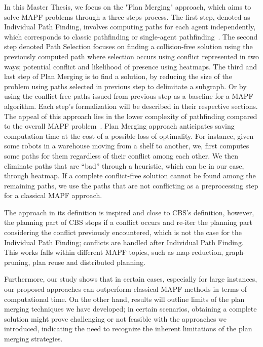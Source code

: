 In this Master Thesis, we focus on the "Plan Merging" approach, which aims to solve MAPF problems through a three-steps process. The first step, denoted as Individual Path Finding, involves computing paths for each agent independently, which corresponds to classic pathfinding or single-agent pathfinding~\cite{foghkuhagu21a}. The second step denoted Path Selection focuses on finding a collision-free solution using the previously computed path where selection occurs using conflict represented in two ways; potential conflict and likelihood of presence using heatmaps. The third and last step of Plan Merging is to find a solution, by reducing the size of the problem using paths selected in previous step to delimitate a subgraph. Or by using the conflict-free paths issued from previous step as a baseline for a MAPF algorithm. Each step's formalization will be described in their respective sections. The appeal of this approach lies in the lower complexity of pathfinding compared to the overall MAPF problem~\cite{nebel19a}. Plan Merging approach anticipates saving computation time at the cost of a possible loss of optimality. For instance, given some robots in a warehouse moving from a shelf to another, we, first computes some paths for them regardless of their conflict among each other. We then eliminate paths that are ``bad'' through a heuristic, which can be in our case, through heatmap. If a complete conflict-free solution cannot be found among the remaining paths, we use the paths that are not conflicting as a preprocessing step for a classical MAPF approach.        

The approach in its definition is inspired and close to CBS's definition, however, the planning part of CBS stops if a conflict occurs and re-iter the planning part considering the conflict previously encountered, which is not the case for the Individual Path Finding; conflicts are handled after Individual Path Finding. This works falls within different MAPF topics, such as map reduction, graph-pruning, plan reuse and distributed planning.

Furthermore, our study shows that in certain cases, especially for large instances, our proposed approaches can outperform classical MAPF methods in terms of computational time. On the other hand, results will outline limits of the plan merging techniques we have developed; in certain scenarios, obtaining a complete solution might prove challenging or not feasible with the approaches we introduced, indicating the need to recognize the inherent limitations of the plan merging strategies.